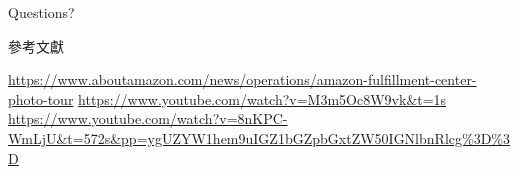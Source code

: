 \documentclass[10pt, aspectratio=169]{beamer}
\begin{document}
\begin{frame}[standout]
  Questions?
\end{frame}

\appendix


\begin{frame}[allowframebreaks]{參考文獻}

  
  

  \begin{thebibliography}{9}
     \url{https://www.aboutamazon.com/news/operations/amazon-fulfillment-center-photo-tour}
     \url{https://www.youtube.com/watch?v=M3m5Oc8W9vk&t=1s}
     \url{https://www.youtube.com/watch?v=8nKPC-WmLjU&t=572s&pp=ygUZYW1hem9uIGZ1bGZpbGxtZW50IGNlbnRlcg\%3D\%3D}
  \end{thebibliography}

\end{frame}
\end{document}

